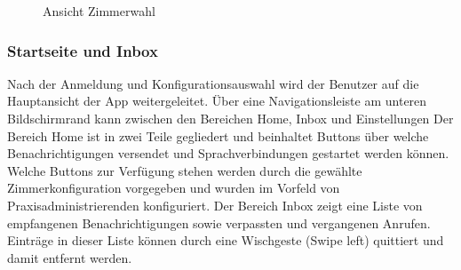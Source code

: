 \begin{figure}[h]
\begin{minipage}[b]{0.45\textwidth}
        \caption{Ansicht Zimmerwahl }
    \end{minipage}

    \label{fig:MobileClient-Screens1}

\end{figure}

\clearpage

\subsubsection*{Startseite und Inbox}

Nach der Anmeldung und Konfigurationsauswahl wird der Benutzer auf die Hauptansicht der App weitergeleitet.
Über eine Navigationsleiste am unteren Bildschirmrand kann zwischen den Bereichen Home, Inbox und Einstellungen
Der Bereich Home ist in zwei Teile gegliedert und beinhaltet Buttons über welche Benachrichtigungen versendet und Sprachverbindungen gestartet werden können.
Welche Buttons zur Verfügung stehen werden durch die gewählte Zimmerkonfiguration vorgegeben und wurden im Vorfeld von Praxisadministrierenden konfiguriert.
Der Bereich Inbox zeigt eine Liste von empfangenen Benachrichtigungen sowie verpassten und vergangenen Anrufen.
Einträge in dieser Liste können durch eine Wischgeste (Swipe left) quittiert und damit entfernt werden.

